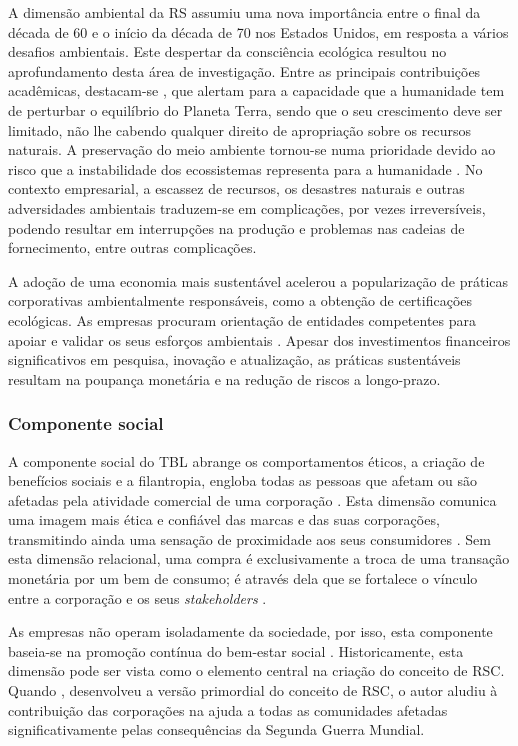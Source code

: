 \documentclass[portuguese]{textolivre}
\begin{document}
A dimensão ambiental da RS assumiu uma nova importância entre o final da década de 60 e o início da década de 70 nos Estados Unidos, em resposta a vários desafios ambientais. Este despertar da consciência ecológica resultou no aprofundamento desta área de investigação. Entre as principais contribuições acadêmicas, destacam-se \textcite{dunlap_new_1978}, que alertam para a capacidade que a humanidade tem de perturbar o equilíbrio do Planeta Terra, sendo que o seu crescimento deve ser limitado, não lhe cabendo qualquer direito de apropriação sobre os recursos naturais. A preservação do meio ambiente tornou-se numa prioridade devido ao risco que a instabilidade dos ecossistemas representa para a humanidade \cite{berkowitz_most_2021}. No contexto empresarial, a escassez de recursos, os desastres naturais e outras adversidades ambientais traduzem-se em complicações, por vezes irreversíveis, podendo resultar em interrupções na produção e problemas nas cadeias de fornecimento, entre outras complicações. 

A adoção de uma economia mais sustentável acelerou a popularização de práticas corporativas ambientalmente responsáveis, como a obtenção de certificações ecológicas. As empresas procuram orientação de entidades competentes para apoiar e validar os seus esforços ambientais \cite{lambin_global_2020}. Apesar dos investimentos financeiros significativos em pesquisa, inovação e atualização, as práticas sustentáveis resultam na poupança monetária e na redução de riscos a longo-prazo.


\subsubsection{Componente social}\label{sec-formato}
A componente social do TBL abrange os comportamentos éticos, a criação de benefícios sociais e a filantropia, engloba todas as pessoas que afetam ou são afetadas pela atividade comercial de uma corporação \cite{ksiezak_triple_2018}. Esta dimensão comunica uma imagem mais ética e confiável das marcas e das suas corporações, transmitindo ainda uma sensação de proximidade aos seus consumidores \cite{kotler_marketing_2022}. Sem esta dimensão relacional, uma compra é exclusivamente a troca de uma transação monetária por um bem de consumo; é através dela que se fortalece o vínculo entre a corporação e os seus \textit{stakeholders} \cite{conley_como_2010}.  

As empresas não operam isoladamente da sociedade, por isso, esta componente baseia-se na promoção contínua do bem-estar social \cite{porter_competitive_2002}. Historicamente, esta dimensão pode ser vista como o elemento central na criação do conceito de RSC. Quando \textcite{bowen_social_1953}, desenvolveu a versão primordial do conceito de RSC, o autor aludiu à contribuição das corporações na ajuda a todas as comunidades afetadas significativamente pelas consequências da Segunda Guerra Mundial. 
\end{document}
